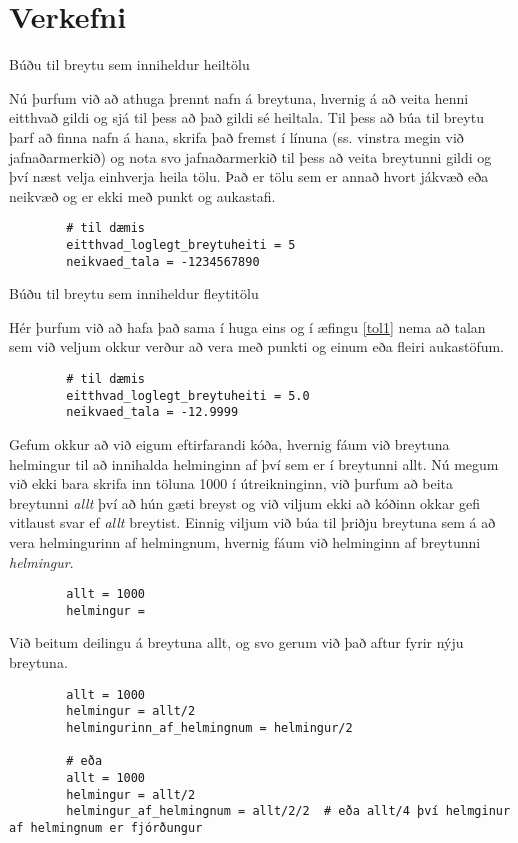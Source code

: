 \section{Verkefni}
\begin{exercise}\label{tol1}
		Búðu til breytu sem inniheldur heiltölu
	\end{exercise}
	\begin{Answer}[ref={tol1}]
		Nú þurfum við að athuga þrennt nafn á breytuna, hvernig á að veita henni eitthvað gildi og sjá til þess að það gildi sé heiltala.
		Til þess að búa til breytu þarf að finna nafn á hana, skrifa það fremst í línuna (ss. vinstra megin við jafnaðarmerkið) og nota svo jafnaðarmerkið til þess að veita breytunni gildi og því næst velja einhverja heila tölu.
		Það er tölu sem er annað hvort jákvæð eða neikvæð og er ekki með punkt og aukastafi.
	\begin{lstlisting}
		# til dæmis
		eitthvad_loglegt_breytuheiti = 5
		neikvaed_tala = -1234567890
	\end{lstlisting}
\end{Answer}

\begin{exercise}\label{tol2}
	Búðu til breytu sem inniheldur fleytitölu
\end{exercise}
\begin{Answer}[ref={tol2}]
	Hér þurfum við að hafa það sama í huga eins og í æfingu \ref{tol1} nema að talan sem við veljum okkur verður að vera með punkti og einum eða fleiri aukastöfum.
	\begin{lstlisting}
		# til dæmis
		eitthvad_loglegt_breytuheiti = 5.0
		neikvaed_tala = -12.9999
	\end{lstlisting}
\end{Answer}


\begin{exercise}\label{tol3}
	Gefum okkur að við eigum eftirfarandi kóða, hvernig fáum við breytuna helmingur til að innihalda helminginn af því sem er í breytunni allt.
	Nú megum við ekki bara skrifa inn töluna 1000 í útreikninginn, við þurfum að beita breytunni \textit{allt} því að hún gæti breyst og við viljum ekki að kóðinn okkar gefi vitlaust svar ef \textit{allt} breytist.
	Einnig viljum við búa til þriðju breytuna sem á að vera helmingurinn af helmingnum, hvernig fáum við helminginn af breytunni \textit{helmingur}.
	\begin{lstlisting}
		allt = 1000
		helmingur =\end{lstlisting}
\end{exercise}
\begin{Answer}[ref={tol3}]
	Við beitum deilingu á breytuna allt, og svo gerum við það aftur fyrir nýju breytuna.
	\begin{lstlisting}
		allt = 1000
		helmingur = allt/2
		helmingurinn_af_helmingnum = helmingur/2
		
		# eða
		allt = 1000
		helmingur = allt/2
		helmingur_af_helmingnum = allt/2/2  # eða allt/4 því helmginur af helmingnum er fjórðungur
	\end{lstlisting}
\end{Answer}


